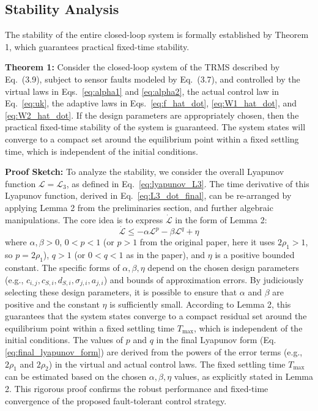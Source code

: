 \subsection{Stability Analysis}
\label{sec:stability_analysis_trms}

The stability of the entire closed-loop system is formally established by Theorem 1, which guarantees practical fixed-time stability.

\textbf{Theorem 1:} Consider the closed-loop system of the TRMS described by Eq.~(3.9), subject to sensor faults modeled by Eq.~(3.7), and controlled by the virtual laws in Eqs.~\eqref{eq:alpha1} and \eqref{eq:alpha2}, the actual control law in Eq.~\eqref{eq:uk}, the adaptive laws in Eqs.~\eqref{eq:f_hat_dot}, \eqref{eq:W1_hat_dot}, and \eqref{eq:W2_hat_dot}. If the design parameters are appropriately chosen, then the practical fixed-time stability of the system is guaranteed. The system states will converge to a compact set around the equilibrium point within a fixed settling time, which is independent of the initial conditions.

\textbf{Proof Sketch:}
To analyze the stability, we consider the overall Lyapunov function $\mathcal{L} = \mathcal{L}_3$, as defined in Eq.~\eqref{eq:lyapunov_L3}. The time derivative of this Lyapunov function, derived in Eq.~\eqref{eq:L3_dot_final}, can be re-arranged by applying Lemma 2 from the preliminaries section, and further algebraic manipulations. The core idea is to express $\dot{\mathcal{L}}$ in the form of Lemma 2:
\begin{equation}
    \dot{\mathcal{L}} \le -\alpha \mathcal{L}^p - \beta \mathcal{L}^q + \eta \label{eq:final_lyapunov_form}
\end{equation}
where $\alpha, \beta > 0$, $0 < p < 1$ (or $p > 1$ from the original paper, here it uses $2\rho_1 > 1$, so $p=2\rho_1$), $q > 1$ (or $0<q<1$ as in the paper), and $\eta$ is a positive bounded constant. The specific forms of $\alpha, \beta, \eta$ depend on the chosen design parameters (e.g., $c_{i,j}, c_{S,i}, d_{S,i}, \sigma_{j,i}, a_{j,i}$) and bounds of approximation errors.
By judiciously selecting these design parameters, it is possible to ensure that $\alpha$ and $\beta$ are positive and the constant $\eta$ is sufficiently small. According to Lemma 2, this guarantees that the system states converge to a compact residual set around the equilibrium point within a fixed settling time $T_{\max}$, which is independent of the initial conditions. The values of $p$ and $q$ in the final Lyapunov form (Eq. \eqref{eq:final_lyapunov_form}) are derived from the powers of the error terms (e.g., $2\rho_1$ and $2\rho_2$) in the virtual and actual control laws. The fixed settling time $T_{\max}$ can be estimated based on the chosen $\alpha, \beta, \eta$ values, as explicitly stated in Lemma 2. This rigorous proof confirms the robust performance and fixed-time convergence of the proposed fault-tolerant control strategy.


